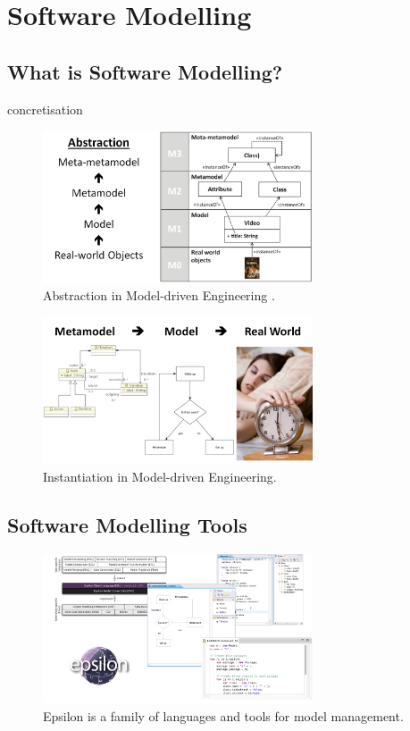 \documentclass[12pt, a4paper]{report}
\begin{document}
\section{Software Modelling}

\subsection{What is Software Modelling?}
concretisation
\begin{figure}[ht]
\centering
\includegraphics[width=8cm]{abstraction}
\caption{Abstraction in Model-driven Engineering \cite{brambilla2012model}.}
\label{fig:abstraction}
\end{figure}


\begin{figure}[ht]
\centering
\includegraphics[width=8cm]{concretisation}
\caption{Instantiation in Model-driven Engineering.}
\label{fig:concretisation}
\end{figure}

\subsection{Software Modelling Tools}

\begin{figure}[ht]
\centering
\includegraphics[width=8cm]{epsilon}
\caption{Epsilon is a family of languages and tools for model management\cite{kolovos2015eugenia}.}
\label{fig:epsilon}
\end{figure}
\end{document}

